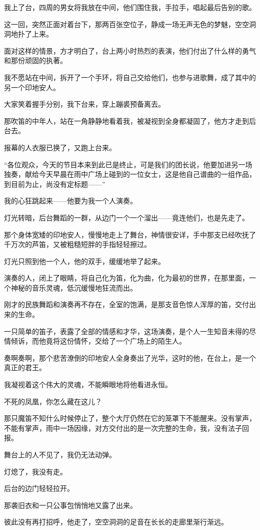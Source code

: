 \par 我上了台，四周的男女将我放在中间，他们围住我，手拉手，唱起最后告别的歌。
\par 这一回，突然正面对着台下，那两百张空位子，静成一场无声无色的梦魅，空空洞洞地扑了上来。
\par 面对这样的情景，方才明白了，台上两小时热烈的表演，他们付出了什么样的勇气和那份顽固的执著。
\par 我不愿站在中间，拆开了一个手环，将自己交给他们，也参与进歌舞，成了其中的另一个印地安人。
\par 大家笑着握手分别，我下台来，穿上蹦裘预备离去。
\par 那吹笛的中年人，站在一角静静地看着我，被凝视到全身都凝固了，他方才走到后台去。
\par 报幕的人衣服已换了，又跑上台来。
\par “各位观众，今天的节目本来到此已是终止，可是我们的团长说，他要加进另一场独奏，献给今天早晨在雨中广场上碰到的一位女士，这是他自己谱曲的一组作品，到目前为止，尚没有定标题——”
\par 我的心狂跳起来——他要为我一个人演奏。
\par 灯光转暗，后台舞蹈的一群，从边门一个一个溜出——竟连他们，也是先走了。
\par 那个身体宽矮的印地安人，慢慢地走上了舞台，神情很安详，手中那支已经吹抚了千万次的芦笛，又被粗糙短胖的手指轻轻擦过。
\par 灯光只照到他一个人，他的双手，缓缓地举了起来。
\par 演奏的人，闭上了眼睛，将自己化为笛，化为曲，化为最初的世界，在那里面，一个神秘的音乐灵魂，低沉缓慢地狂流而出。
\par 刚才的民族舞蹈和演奏再不存在，全室的饱满，是那支音色惊人浑厚的笛，交付出来的生命。
\par 一只简单的笛子，表露了全部的情感和才华，这场演奏，是个人一生知音未得的尽情倾诉，而他竟将这份情怀，交给了一个广场上的陌生人。
\par 奏啊奏啊，那个悲苦潦倒的印地安人全身奏出了光华，这时的他，在台上，是一个真正的君王。
\par 我凝视着这个伟大的灵魂，不能瞬眼地将他看进永恒。
\par 不死的凤凰，你怎么藏在这儿？
\par 那只魔笛不知什么时候停止了，整个大厅仍然在它的笼罩下不能醒来。没有掌声，不能有掌声，雨中一场因缘，对方交付出的是一次完整的生命，我，没有法子回报。
\par 舞台上的人不见了，我仍无法动弹。
\par 灯熄了，我没有走。
\par 后台的边门轻轻拉开。
\par 那袭旧衣和一只公事包悄悄地又露了出来。
\par 彼此没有再打招呼，他走了，空空洞洞的足音在长长的走廊里渐行渐远。


